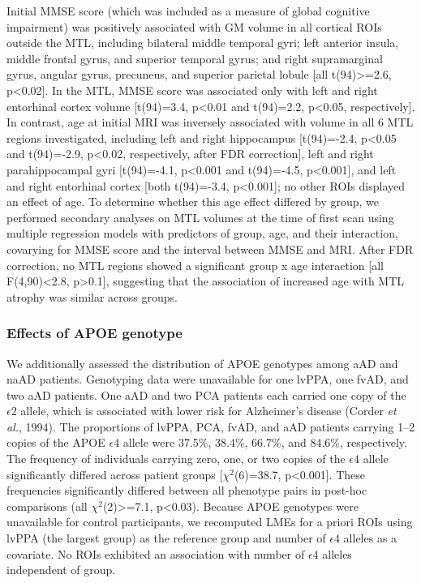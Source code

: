 \documentclass[]{article}
\begin{document}
Initial MMSE score (which was included as a measure of global cognitive
impairment) was positively associated with GM volume in all cortical
ROIs outside the MTL, including bilateral middle temporal gyri; left
anterior insula, middle frontal gyrus, and superior temporal gyrus; and
right supramarginal gyrus, angular gyrus, precuneus, and superior
parietal lobule {[}all t(94)\textgreater{}=2.6, p\textless{}0.02{]}. In
the MTL, MMSE score was associated only with left and right entorhinal
cortex volume {[}t(94)=3.4, p\textless{}0.01 and t(94)=2.2,
p\textless{}0.05, respectively{]}. In contrast, age at initial MRI was
inversely associated with volume in all 6 MTL regions investigated,
including left and right hippocampus {[}t(94)=-2.4, p\textless{}0.05 and
t(94)=-2.9, p\textless{}0.02, respectively, after FDR correction{]},
left and right parahippocampal gyri {[}t(94)=-4.1, p\textless{}0.001 and
t(94)=-4.5, p\textless{}0.001{]}, and left and right entorhinal cortex
{[}both t(94)=-3.4, p\textless{}0.001{]}; no other ROIs displayed an
effect of age. To determine whether this age effect differed by group,
we performed secondary analyses on MTL volumes at the time of first scan
using multiple regression models with predictors of group, age, and
their interaction, covarying for MMSE score and the interval between
MMSE and MRI. After FDR correction, no MTL regions showed a significant
group x age interaction {[}all F(4,90)\textless{}2.8,
p\textgreater{}0.1{]}, suggesting that the association of increased age
with MTL atrophy was similar across groups.

\subsubsection*{Effects of APOE
genotype}\label{effects-of-apoe-genotype}

We additionally assessed the distribution of APOE genotypes among aAD
and naAD patients. Genotyping data were unavailable for one lvPPA, one
fvAD, and two aAD patients. One aAD and two PCA patients each carried
one copy of the \(\epsilon2\) allele, which is associated with lower
risk for Alzheimer's disease (Corder \emph{et al.}, 1994). The
proportions of lvPPA, PCA, fvAD, and aAD patients carrying 1--2 copies
of the APOE \(\epsilon4\) allele were 37.5\%, 38.4\%, 66.7\%, and
84.6\%, respectively. The frequency of individuals carrying zero, one,
or two copies of the \(\epsilon4\) allele significantly differed across
patient groups {[}\(\chi^2\)(6)=38.7, p\textless{}0.001{]}. These
frequencies significantly differed between all phenotype pairs in
post-hoc comparisons (all \(\chi^2\)(2)\textgreater{}=7.1,
p\textless{}0.03). Because APOE genotypes were unavailable for control
participants, we recomputed LMEs for a priori ROIs using lvPPA (the
largest group) as the reference group and number of \(\epsilon4\)
alleles as a covariate. No ROIs exhibited an association with number of
\(\epsilon4\) alleles independent of group.
\end{document}
